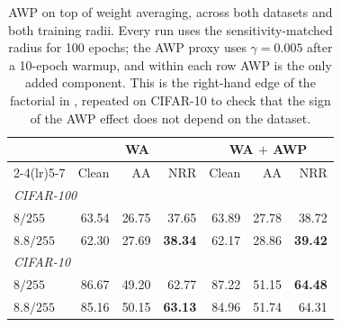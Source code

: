 \begin{table}[!htbp]
  \centering \small \setlength{\tabcolsep}{3.4pt}
  \caption{AWP on top of weight averaging, across both datasets and both training radii. Every run
  uses the sensitivity-matched radius for 100 epochs; the AWP proxy uses $\gamma=0.005$ after a
  10-epoch warmup, and within each row AWP is the only added component. This is the right-hand edge of
  the factorial in , repeated on CIFAR-10 to check that the sign of the AWP effect
  does not depend on the dataset.}
  \label{tab:stackboth}
  \begin{tabular}{lrrrrrr}
    \toprule
    & \multicolumn{3}{c}{WA} & \multicolumn{3}{c}{WA $+$ AWP} \\
    \cmidrule(lr){2-4}\cmidrule(lr){5-7}
    & Clean & AA & NRR & Clean & AA & NRR \\
    \midrule
    \multicolumn{7}{l}{\emph{CIFAR-100}} \\
    $8/255$   & 63.54 & 26.75 & 37.65 & 63.89 & 27.78 & 38.72 \\
    $8.8/255$ & 62.30 & 27.69 & \textbf{38.34} & 62.17 & 28.86 & \textbf{39.42} \\
    \midrule
    \multicolumn{7}{l}{\emph{CIFAR-10}} \\
    $8/255$   & 86.67 & 49.20 & 62.77 & 87.22 & 51.15 & \textbf{64.48} \\
    $8.8/255$ & 85.16 & 50.15 & \textbf{63.13} & 84.96 & 51.74 & 64.31 \\
    \bottomrule
  \end{tabular}
\end{table}

